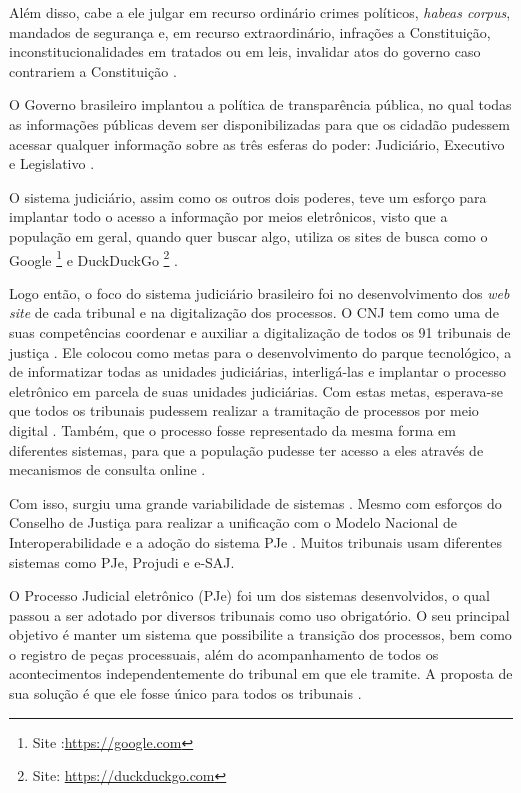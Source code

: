 Além disso, cabe a ele julgar em recurso ordinário crimes políticos, \textit{habeas corpus}, mandados de segurança e, em recurso extraordinário, infrações a Constituição, inconstitucionalidades em tratados ou em leis, invalidar atos do governo caso contrariem a Constituição \cite{BRASIL1988}.

O Governo brasileiro implantou a política de transparência pública, no qual todas as informações públicas devem ser disponibilizadas para que os cidadão pudessem acessar qualquer informação sobre as três esferas do poder: Judiciário, Executivo e Legislativo \cite{CONGRESSO2011}.

O sistema judiciário, assim como os outros dois poderes, teve um esforço para implantar todo o acesso a informação por meios eletrônicos, visto que a população em geral, quando quer buscar algo, utiliza os sites de busca como o Google \footnote{Site :\url{https://google.com}} e DuckDuckGo \footnote{Site: \url{https://duckduckgo.com}} \cite{RUSCHEL2011}.

Logo então, o foco do sistema judiciário brasileiro foi no desenvolvimento dos \textit{web site} de cada tribunal e na digitalização dos processos. O CNJ  tem como uma de suas competências coordenar e auxiliar a digitalização de todos os 91 tribunais de justiça \cite{RUSCHEL2011}. Ele colocou como metas para o desenvolvimento do parque tecnológico, a de informatizar todas as unidades judiciárias, interligá-las e implantar  o  processo  eletrônico  em  parcela  de  suas unidades judiciárias. %
Com estas metas, esperava-se que todos os tribunais pudessem realizar a tramitação de processos por meio digital \cite{CNJ2009}. Também, que o processo fosse representado da mesma forma em diferentes sistemas, para que a população pudesse ter acesso a eles através de mecanismos de consulta online \cite{RUSCHEL2011}.

Com isso, surgiu uma grande variabilidade de sistemas%
. Mesmo com esforços do Conselho de Justiça para realizar a unificação com o Modelo Nacional de Interoperabilidade \cite{CNJ2009} e a adoção do sistema PJe%
. Muitos tribunais usam diferentes sistemas como PJe, Projudi e e-SAJ.

O Processo Judicial eletrônico (PJe) foi um dos sistemas desenvolvidos, o qual passou a ser adotado por diversos tribunais como uso obrigatório. O seu principal objetivo é manter um sistema que possibilite a transição dos processos, bem como o registro de peças processuais, além do acompanhamento de todos os acontecimentos independentemente do tribunal em que ele tramite. A proposta de sua solução é que ele fosse único para todos os tribunais \cite{PJe2018}.

